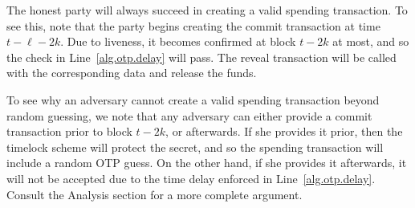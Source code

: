 The honest party will always succeed in creating a valid spending transaction.
To see this, note that the party begins creating the commit transaction at time
$t - \ell - 2k$. Due to liveness, it becomes confirmed at block $t - 2k$ at most,
and so the check in Line~\ref{alg.otp.delay} will pass. The reveal transaction will
be called with the corresponding data and release the funds.

To see why an adversary cannot create a valid spending transaction beyond random
guessing, we note that any adversary can either provide a commit transaction prior
to block $t - 2k$, or afterwards. If she provides it
prior, then the timelock scheme will protect the secret, and so the spending
transaction will include a random OTP guess. On the other hand, if she provides it
afterwards, it will not be accepted due to the time delay enforced
in Line~\ref{alg.otp.delay}. Consult the Analysis section for a more complete argument.
